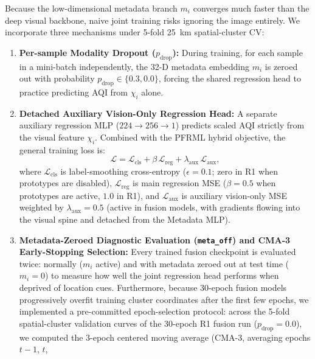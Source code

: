 \documentclass[conference]{IEEEtran}
\begin{document}
Because the low-dimensional metadata branch $m_i$ converges much faster than the
deep visual backbone, naive joint training risks ignoring the image entirely. We
incorporate three mechanisms under 5-fold 25~km spatial-cluster CV:
\begin{enumerate}
  \item \textbf{Per-sample Modality Dropout ($p_{\text{drop}}$):} During
        training, for each sample in a mini-batch independently, the 32-D
        metadata embedding $m_i$ is zeroed out with probability
        $p_{\text{drop}} \in \{0.3, 0.0\}$, forcing the shared regression head
        to practice predicting AQI from $\chi_i$ alone.
  \item \textbf{Detached Auxiliary Vision-Only Regression Head:} A separate
        auxiliary regression MLP ($224 \to 256 \to 1$) predicts scaled AQI
        strictly from the visual feature $\chi_i$. Combined with the PFRML
        hybrid objective, the general training loss is:
        \begin{equation}
          \mathcal{L}
          = \mathcal{L}_{\text{cls}}
            + \beta\,\mathcal{L}_{\text{reg}}
            + \lambda_{\text{aux}}\,\mathcal{L}_{\text{aux}}, \label{eq:total_loss}
        \end{equation}
        where $\mathcal{L}_{\text{cls}}$ is label-smoothing cross-entropy
        ($\epsilon = 0.1$; zero in R1 when prototypes are disabled),
        $\mathcal{L}_{\text{reg}}$ is main regression MSE ($\beta = 0.5$ when
        prototypes are active, $1.0$ in R1), and $\mathcal{L}_{\text{aux}}$ is
        auxiliary vision-only MSE weighted by $\lambda_{\text{aux}} = 0.5$
        (active in fusion models, with gradients flowing into the visual spine
        and detached from the Metadata MLP).
  \item \textbf{Metadata-Zeroed Diagnostic Evaluation (\texttt{meta\_off}) and
        CMA-3 Early-Stopping Selection:} Every trained fusion checkpoint is
        evaluated twice: normally ($m_i$ active) and with metadata zeroed out at
        test time ($m_i = 0$) to measure how well the joint regression head
        performs when deprived of location cues. Furthermore, because 30-epoch
        fusion models progressively overfit training cluster coordinates after
        the first few epochs, we implemented a pre-committed epoch-selection
        protocol: across the 5-fold spatial-cluster validation curves of the
        30-epoch R1 fusion run ($p_{\text{drop}} = 0.0$), we computed the
        3-epoch centered moving average (CMA-3, averaging epochs $t - 1$, $t$,

\end{enumerate}
\end{document}
